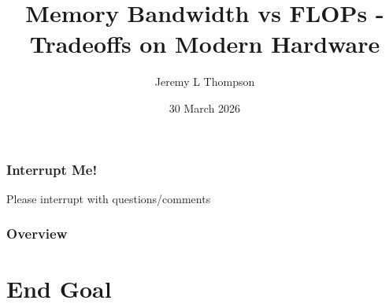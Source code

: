 \documentclass{beamer}
\title[Memory vs FLOPs]{Memory Bandwidth vs FLOPs - Tradeoffs on Modern Hardware
} %
\author{Jeremy L Thompson} %
\institute[CU Boulder] %
{University of Colorado Boulder \\ %
\medskip
\textit{jeremy@jeremylt.org} %
}
\date{30 March 2026} %
\begin{document}
\begin{frame}
\titlepage %
\end{frame}


\begin{frame}
\begin{center}
\frametitle{Interrupt Me!}

Please interrupt with questions/comments\\

\end{center}
\end{frame}


\begin{frame}
\frametitle{Overview} %
\tableofcontents %
\end{frame}

\section{End Goal}
\end{document}
